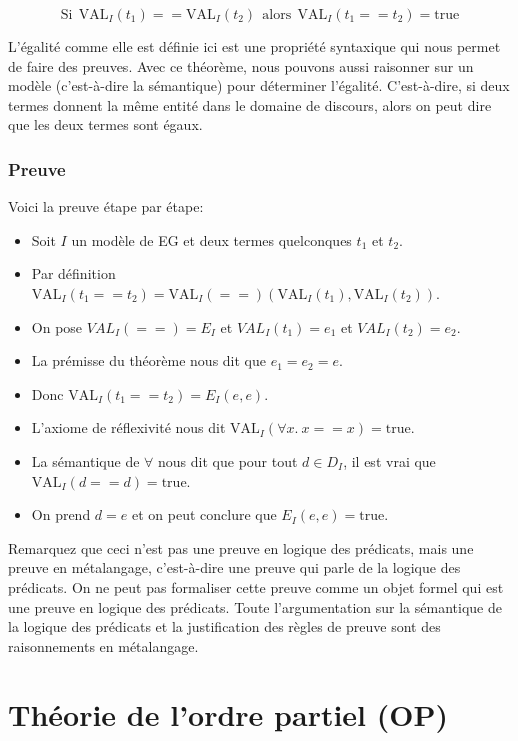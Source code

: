 {$$\mathrm{Si}\ \ \mathrm{VAL}_{I}(t_{1}) ==  \mathrm{VAL}_{I}(t_{2}) \ \ \mathrm{alors}\ \  \mathrm{VAL}_{I}(t_{1} == t_{2}) = \mathrm{true}$$

L'égalité comme elle est définie ici est une propriété syntaxique qui nous permet de faire des preuves.
Avec ce théorème, nous pouvons aussi raisonner sur un modèle (c'est-à-dire la sémantique) pour déterminer l'égalité.
C'est-à-dire, si deux termes donnent la même entité dans le domaine de discours, alors on peut dire que les
deux termes sont égaux.

\subsubsection{Preuve}

Voici la preuve étape par étape:
\begin{itemize}
\item Soit $I$ un modèle de EG et deux termes quelconques $t_{1}$ et $t_{2}$.
\item Par définition $\mathrm{VAL}_{I}(t_{1} == t_{2}) = \mathrm{VAL}_{I}(==)(\mathrm{VAL}_{I}(t_{1}), \mathrm{VAL}_{I}(t_{2}))$.
\item On pose $VAL_{I}(==) = E_{I}$ et $VAL_{I}(t_{1}) = e_1$ et $VAL_{I}(t_{2}) = e_2$.
\item La prémisse du théorème nous dit que $e_1 = e_2 = e$.
\item Donc $\mathrm{VAL}_{I}(t_{1} == t_{2}) =E_{I}(e,e)$.
\item L'axiome de réflexivité nous dit $\mathrm{VAL}_{I}(\forall x.\ x==x)= \mathrm{true}$.
\item La sémantique de $\forall$ nous dit que pour tout $d \in D_I$, il est vrai que $\mathrm{VAL}_{I}(d==d)=\mathrm{true}$.
\item On prend $d=e$ et on peut conclure que $E_{I}(e,e)=\mathrm{true}$.
\end{itemize}

\vspace{\baselineskip}
Remarquez que ceci n'est pas une preuve en logique des prédicats, mais une preuve en métalangage, c'est-à-dire
une preuve qui parle de la logique des prédicats.
On ne peut pas formaliser cette preuve comme un objet formel qui est une preuve en logique des prédicats.
Toute l'argumentation sur la sémantique de la logique des prédicats et la justification des règles de preuve
sont des raisonnements en métalangage.

\section{Théorie de l'ordre partiel (OP)}

}
